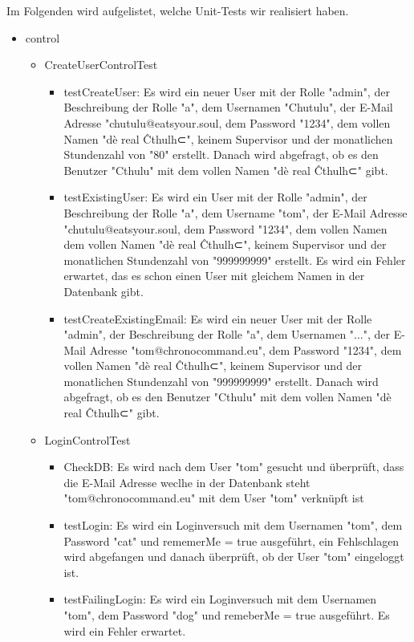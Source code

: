 Im Folgenden wird aufgelistet, welche Unit-Tests wir realisiert haben.

\begin{itemize}
  \item control
    \begin{itemize}
      \item CreateUserControlTest
        \begin{itemize} 
          \item testCreateUser: Es wird ein neuer User mit der Rolle "admin", der Beschreibung der Rolle "a", dem Usernamen   "Chutulu", der E-Mail Adresse "chutulu@eatsyour.soul, dem Password "1234", dem vollen Namen "dè real Ĉthulh⊂", keinem Supervisor und der monatlichen Stundenzahl von "80" erstellt. Danach wird abgefragt, ob es den Benutzer "Cthulu" mit dem vollen Namen "dè real Ĉthulh⊂" gibt.
      \item testExistingUser: Es wird ein User mit der Rolle "admin", der Beschreibung der Rolle "a", dem Username "tom", der E-Mail Adresse "chutulu@eatsyour.soul, dem Password "1234", dem vollen Namen dem vollen Namen "dè real Ĉthulh⊂", keinem Supervisor und der monatlichen Stundenzahl von "999999999" erstellt. Es wird ein Fehler erwartet, das es schon einen User mit gleichem Namen in der Datenbank gibt. 
           \item testCreateExistingEmail: Es wird ein neuer User mit der Rolle "admin", der Beschreibung der Rolle "a", dem Usernamen   "...", der E-Mail Adresse "tom@chronocommand.eu", dem Password "1234", dem vollen Namen "dè real Ĉthulh⊂", keinem Supervisor und der monatlichen Stundenzahl von "999999999" erstellt. Danach wird abgefragt, ob es den Benutzer "Cthulu" mit dem vollen Namen "dè real Ĉthulh⊂" gibt.
          \end{itemize}
        \item LoginControlTest
          \begin{itemize}
            \item CheckDB: Es wird nach dem User "tom" gesucht und überprüft, dass die E-Mail Adresse weclhe in der Datenbank steht "tom@chronocommand.eu" mit dem User "tom" verknüpft ist
            \item testLogin: Es wird ein Loginversuch mit dem Usernamen "tom", dem Password "cat" und rememerMe = true ausgeführt, ein Fehlschlagen wird abgefangen und danach überprüft, ob der User "tom" eingeloggt ist.
            \item testFailingLogin: Es wird ein Loginversuch mit dem Usernamen "tom", dem Password "dog" und remeberMe = true ausgeführt. Es wird ein Fehler erwartet.

\end{itemize}
\end{itemize}
\end{itemize}
